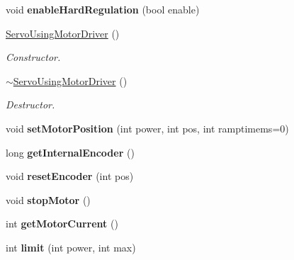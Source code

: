 \begin{DoxyCompactItemize}
void {\bfseries enable\+Hard\+Regulation} (bool enable)
\item 
\mbox{\label{classServoUsingMotorDriver_acc8ccf92143efa853b83940d2d690817}} 
\hyperlink{classServoUsingMotorDriver_acc8ccf92143efa853b83940d2d690817}{Servo\+Using\+Motor\+Driver} ()
\begin{DoxyCompactList}\small\item\em Constructor. \end{DoxyCompactList}\item 
\mbox{\label{classServoUsingMotorDriver_a8aa604a17555514d3ddf78e15f467faf}} 
\hyperlink{classServoUsingMotorDriver_a8aa604a17555514d3ddf78e15f467faf}{$\sim$\+Servo\+Using\+Motor\+Driver} ()
\begin{DoxyCompactList}\small\item\em Destructor. \end{DoxyCompactList}\item 
\mbox{\label{classServoUsingMotorDriver_a29f865e4800db3a112e598337eba704c}} 
void {\bfseries set\+Motor\+Position} (int power, int pos, int ramptimems=0)
\item 
\mbox{\label{classServoUsingMotorDriver_a64c62fd0ecb287fe45770c387e394eac}} 
long {\bfseries get\+Internal\+Encoder} ()
\item 
\mbox{\label{classServoUsingMotorDriver_acf78dbe83df0a7744fd40920a6388efd}} 
void {\bfseries reset\+Encoder} (int pos)
\item 
\mbox{\label{classServoUsingMotorDriver_a58fbf805d7bb382b505ea634e6bcbb08}} 
void {\bfseries stop\+Motor} ()
\item 
\mbox{\label{classServoUsingMotorDriver_ad76b35929d55c4249c5e7c3818c053b6}} 
int {\bfseries get\+Motor\+Current} ()
\item 
\mbox{\label{classServoUsingMotorDriver_ae55b5b62a1c2a4cb2d9019528ba5f6cd}} 
int {\bfseries limit} (int power, int max)
\item 
\mbox{\label{classServoUsingMotorDriver_acc8ccf92143efa853b83940d2d690817}} 

\end{DoxyCompactItemize}
